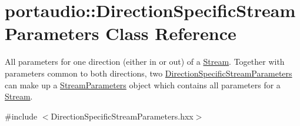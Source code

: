 \hypertarget{classportaudio_1_1_direction_specific_stream_parameters}{}\section{portaudio\+:\+:Direction\+Specific\+Stream\+Parameters Class Reference}
\label{classportaudio_1_1_direction_specific_stream_parameters}


All parameters for one direction (either in or out) of a \hyperlink{classportaudio_1_1_stream}{Stream}. Together with parameters common to both directions, two \hyperlink{classportaudio_1_1_direction_specific_stream_parameters}{Direction\+Specific\+Stream\+Parameters} can make up a \hyperlink{classportaudio_1_1_stream_parameters}{Stream\+Parameters} object which contains all parameters for a \hyperlink{classportaudio_1_1_stream}{Stream}.  




{\ttfamily \#include $<$Direction\+Specific\+Stream\+Parameters.\+hxx$>$}


